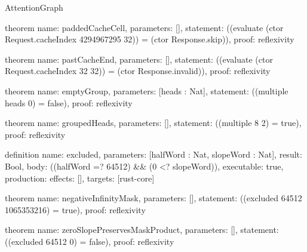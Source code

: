 \begin{lexlean}{AttentionGraph}
\begin{semanticmodule}
theorem{
  name: paddedCacheCell,
  parameters: [],
  statement: ((evaluate (ctor Request.cacheIndex 4294967295 32)) = (ctor Response.skip)),
  proof: reflexivity{}
}

theorem{
  name: pastCacheEnd,
  parameters: [],
  statement: ((evaluate (ctor Request.cacheIndex 32 32)) = (ctor Response.invalid)),
  proof: reflexivity{}
}

theorem{
  name: emptyGroup,
  parameters: [heads : Nat],
  statement: ((multiple heads 0) = false),
  proof: reflexivity{}
}

theorem{
  name: groupedHeads,
  parameters: [],
  statement: ((multiple 8 2) = true),
  proof: reflexivity{}
}

definition{
  name: excluded,
  parameters: [halfWord : Nat, slopeWord : Nat],
  result: Bool,
  body: ((halfWord =? 64512) && (0 <? slopeWord)),
  executable: true,
  production: {effects: [], targets: [rust-core]}
}

theorem{
  name: negativeInfinityMask,
  parameters: [],
  statement: ((excluded 64512 1065353216) = true),
  proof: reflexivity{}
}

theorem{
  name: zeroSlopePreservesMaskProduct,
  parameters: [],
  statement: ((excluded 64512 0) = false),
  proof: reflexivity{}
}
\end{semanticmodule}
\end{lexlean}
